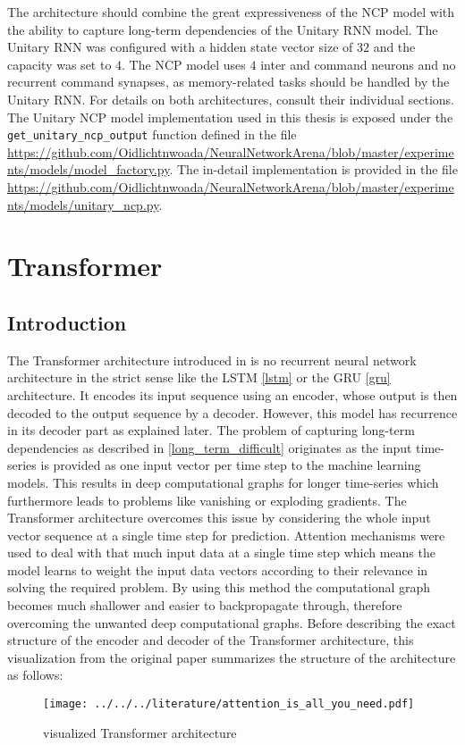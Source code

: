 \documentclass[draft,final]{vutinfth} %
\begin{document}
    The architecture should combine the great expressiveness of the NCP model with the ability to capture long-term dependencies of the Unitary RNN model.
    The Unitary RNN was configured with a hidden state vector size of $32$ and the capacity was set to $4$. 
    The NCP model uses $4$ inter and command neurons and no recurrent command synapses, as memory-related tasks should be handled by the Unitary RNN.
    For details on both architectures, consult their individual sections.
    The Unitary NCP model implementation used in this thesis is exposed under the \texttt{get\_unitary\_ncp\_output} function defined in the file \url{https://github.com/Oidlichtnwoada/NeuralNetworkArena/blob/master/experiments/models/model_factory.py}.
    The in-detail implementation is provided in the file \url{https://github.com/Oidlichtnwoada/NeuralNetworkArena/blob/master/experiments/models/unitary_ncp.py}.

    \section{Transformer} \label{transformer}
    \subsection{Introduction}
    The Transformer architecture introduced in \cite{Transformer} is no recurrent neural network architecture in the strict sense like the LSTM \ref{lstm} or the GRU \ref{gru} architecture.
    It encodes its input sequence using an encoder, whose output is then decoded to the output sequence by a decoder.
    However, this model has recurrence in its decoder part as explained later.
    The problem of capturing long-term dependencies as described in \ref{long_term_difficult} originates as the input time-series is provided as one input vector per time step to the machine learning models.
    This results in deep computational graphs for longer time-series which furthermore leads to problems like vanishing or exploding gradients.
    The Transformer architecture overcomes this issue by considering the whole input vector sequence at a single time step for prediction. 
    Attention mechanisms were used to deal with that much input data at a single time step which means the model learns to weight the input data vectors according to their relevance in solving the required problem.
    By using this method the computational graph becomes much shallower and easier to backpropagate through, therefore overcoming the unwanted deep computational graphs.
    Before describing the exact structure of the encoder and decoder of the Transformer architecture, this visualization from the original paper summarizes the structure of the architecture as follows:
    \begin{figure}[H]
        \centering{}
        \texttt{[image: ../../../literature/attention\_is\_all\_you\_need.pdf]}
        \caption{visualized Transformer architecture \cite[p. 3]{Transformer}}
        \label{fig:transformer_vis}
    \end{figure}
\end{document}
